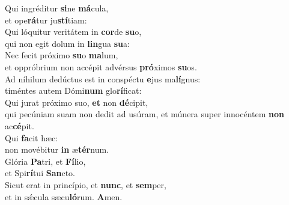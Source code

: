 \evenverse Qui ingréditur \textbf{si}ne \textbf{má}cula,~\*\\
\evenverse et ope\textbf{rá}tur ju\textbf{stí}tiam:\\
\oddverse Qui lóquitur veritátem in \textbf{cor}de \textbf{su}o,~\*\\
\oddverse qui non egit dolum in \textbf{lin}gua \textbf{su}a:\\
\evenverse Nec fecit próximo \textbf{su}o \textbf{ma}lum,~\*\\
\evenverse et oppróbrium non accépit advérsus \textbf{pró}ximos \textbf{su}os.\\
\oddverse Ad níhilum dedúctus est in conspéctu \textbf{e}jus ma\textbf{lí}gnus:~\*\\
\oddverse timéntes autem Dómi\textbf{num} glo\textbf{rí}ficat:\\
\evenverse Qui jurat próximo suo, \textbf{et} non \textbf{dé}cipit,~\*\\
\evenverse qui pecúniam suam non dedit ad usúram, et múnera super innocéntem \textbf{non} ac\textbf{cé}pit.\\
\oddverse Qui \textbf{fa}cit hæc:~\*\\
\oddverse non movébitur \textbf{in} æ\textbf{tér}num.\\
\evenverse Glória \textbf{Pa}tri, et \textbf{Fí}lio,~\*\\
\evenverse et Spi\textbf{rí}tui \textbf{San}cto.\\
\oddverse Sicut erat in princípio, et \textbf{nunc}, et \textbf{sem}per,~\*\\
\oddverse et in sǽcula sæcu\textbf{ló}rum. \textbf{A}men.\\
